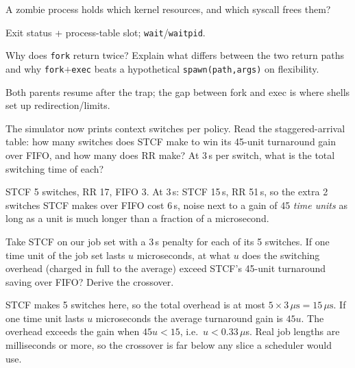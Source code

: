 \begin{exercise}[easy]
A zombie process holds which kernel resources, and which syscall
frees them?
\end{exercise}
\begin{solution}[hint]
Exit status + process-table slot; \texttt{wait}/\texttt{waitpid}.
\end{solution}

\begin{exercise}[medium]
Why does \texttt{fork} return twice? Explain what differs between
the two return paths and why \texttt{fork}$+$\texttt{exec} beats a
hypothetical \texttt{spawn(path,args)} on flexibility.
\end{exercise}
\begin{solution}[hint]
Both parents resume after the trap; the gap between fork and exec
is where shells set up redirection/limits.
\end{solution}

\begin{exercise}[medium]
The simulator now prints context switches per policy. Read the
staggered-arrival table: how many switches does STCF make to win its
45-unit turnaround gain over FIFO, and how many does RR make? At
3\,\textmu s per switch, what is the total switching time of each?
\end{exercise}
\begin{solution}[hint]
STCF 5 switches, RR 17, FIFO 3. At 3\,\textmu s: STCF 15\,\textmu s,
RR 51\,\textmu s, so the extra 2 switches STCF makes over FIFO cost
6\,\textmu s, noise next to a gain of 45 \emph{time units} as long as a
unit is much longer than a fraction of a microsecond.
\end{solution}

\begin{exercise}[hard]
Take STCF on our job set with a 3\,\textmu s penalty for each of its
5 switches. If one time unit of the job set lasts $u$ microseconds, at
what $u$ does the switching overhead (charged in full to the average)
exceed STCF's 45-unit turnaround saving over FIFO? Derive the
crossover.
\end{exercise}
\begin{solution}[hint]
STCF makes 5 switches here, so the total overhead is at most
$5\times3\,\mu\text{s}=15\,\mu\text{s}$. If one time unit lasts $u$
microseconds the average turnaround gain is $45u$. The overhead
exceeds the gain when $45u<15$, i.e.\ $u<0.33\,\mu$s. Real job
lengths are milliseconds or more, so the crossover is far below any
slice a scheduler would use.
\end{solution}


